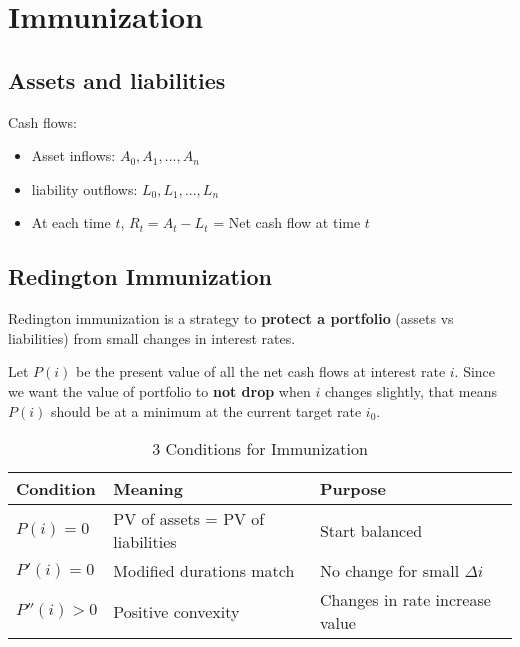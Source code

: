 \chapter{Immunization}

\section{Assets and liabilities}

\begin{comments}
Cash flows: 
    \begin{itemize}
        \item Asset inflows: $A_0, A_1, ... , A_n$
        \item liability outflows: $L_0, L_1, ... , L_n$
        \item At each time $t$, $R_t = A_t - L_t$ = Net cash flow at time $t$
    \end{itemize} 
\end{comments}


















\section{Redington Immunization}

\begin{definition}
    Redington immunization is a strategy to \textbf{protect a portfolio} (assets vs liabilities) 
    from small changes in interest rates. 
\end{definition}


\begin{comments}

    Let $P(i)$ be the present value of all the net cash flows at interest rate $i$. Since we 
    want the value of portfolio to \textbf{not drop} when $i$ changes slightly, that means 
    $P(i)$ should be at a minimum at the current target rate $i_0$. 
\begin{table}[htbp]
\centering
\caption{3 Conditions for Immunization}
\begin{tabular}{lll}
\toprule
\textbf{Condition} & \textbf{Meaning} & \textbf{Purpose} \\
\midrule
$P(i) = 0$ & PV of assets = PV of liabilities & Start balanced \\
$P'(i) = 0$ & Modified durations match & No change for small $\Delta i$ \\
$P''(i) > 0$ & Positive convexity & Changes in rate increase value \\
\bottomrule
\end{tabular}
\end{table}


\end{comments}



